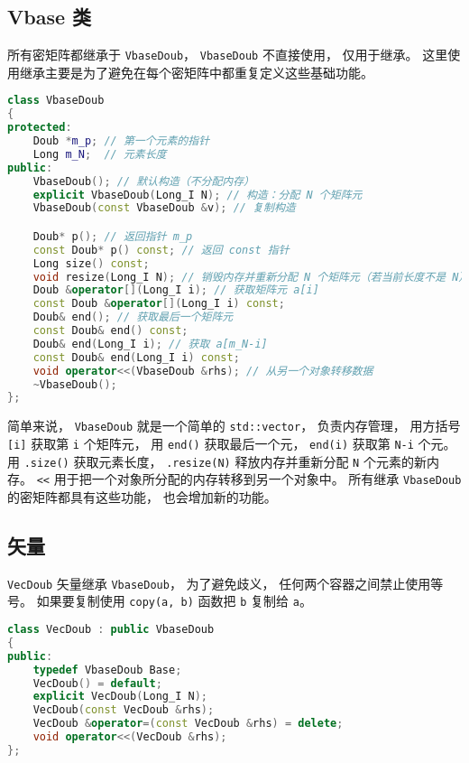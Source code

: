 \subsection{Vbase 类}
所有密矩阵都继承于 \verb|VbaseDoub|， \verb|VbaseDoub| 不直接使用， 仅用于继承。 这里使用继承主要是为了避免在每个密矩阵中都重复定义这些基础功能。
\begin{lstlisting}[language=cpp]
class VbaseDoub
{
protected:
    Doub *m_p; // 第一个元素的指针
    Long m_N;  // 元素长度
public:
    VbaseDoub(); // 默认构造（不分配内存）
    explicit VbaseDoub(Long_I N); // 构造：分配 N 个矩阵元
    VbaseDoub(const VbaseDoub &v); // 复制构造

    Doub* p(); // 返回指针 m_p
    const Doub* p() const; // 返回 const 指针
    Long size() const;
    void resize(Long_I N); // 销毁内存并重新分配 N 个矩阵元（若当前长度不是 N）
    Doub &operator[](Long_I i); // 获取矩阵元 a[i]
    const Doub &operator[](Long_I i) const; 
    Doub& end(); // 获取最后一个矩阵元
    const Doub& end() const;
    Doub& end(Long_I i); // 获取 a[m_N-i]
    const Doub& end(Long_I i) const;
    void operator<<(VbaseDoub &rhs); // 从另一个对象转移数据
    ~VbaseDoub();
};
\end{lstlisting}

简单来说， \verb|VbaseDoub| 就是一个简单的 \verb|std::vector|， 负责内存管理， 用方括号 \verb|[i]| 获取第 \verb|i| 个矩阵元， 用 \verb|end()| 获取最后一个元， \verb|end(i)| 获取第 \verb|N-i| 个元。 用 \verb|.size()| 获取元素长度， \verb|.resize(N)| 释放内存并重新分配 \verb|N| 个元素的新内存。 \verb|<<| 用于把一个对象所分配的内存转移到另一个对象中。 所有继承 \verb|VbaseDoub| 的密矩阵都具有这些功能， 也会增加新的功能。

\subsection{矢量}
\verb|VecDoub| 矢量继承 \verb|VbaseDoub|， 为了避免歧义， 任何两个容器之间禁止使用等号。 如果要复制使用 \verb|copy(a, b)| 函数把 \verb|b| 复制给 \verb|a|。
\begin{lstlisting}[language=cpp]
class VecDoub : public VbaseDoub
{
public:
    typedef VbaseDoub Base;
    VecDoub() = default;
    explicit VecDoub(Long_I N);
    VecDoub(const VecDoub &rhs);
    VecDoub &operator=(const VecDoub &rhs) = delete;
    void operator<<(VecDoub &rhs);
};
\end{lstlisting}

